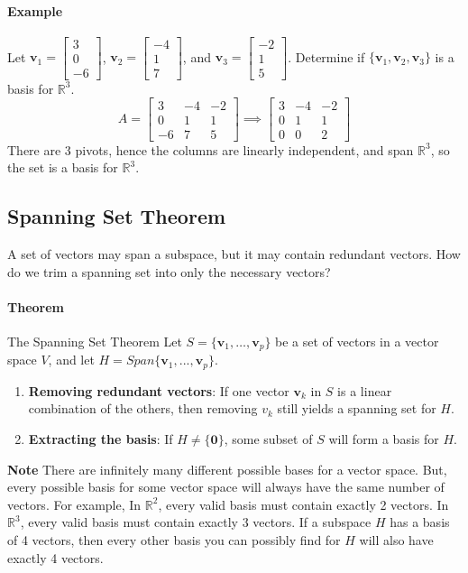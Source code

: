 \documentclass[../linear-algebra.tex]{subfiles}
\begin{document}
\paragraph{Example} Let $\mathbf{v}_{1}=\left[\begin{matrix}3\\ 0\\ -6\end{matrix}\right]$, $\mathbf{v}_{2}=\left[\begin{matrix}-4\\ 1\\ 7\end{matrix}\right]$, and $\mathbf{v}_{3}=\left[\begin{matrix}-2\\ 1\\ 5\end{matrix}\right]$. Determine if $\{\mathbf{v}_{1},\mathbf{v}_{2},\mathbf{v}_{3}\}$ is a basis for $\mathbb{R}^{3}$. 
\[A = \begin{bmatrix} 3 & -4 & -2 \\ 0 & 1 & 1 \\ -6 & 7 & 5 \end{bmatrix} \implies \begin{bmatrix} 3 & -4 & -2 \\ 0 & 1 & 1 \\ 0 & 0 & 2 \end{bmatrix}\]
There are 3 pivots, hence the columns are linearly independent, and span $\mathbb{R}^3$, so the set is a basis for $\mathbb{R}^3$.

\subsection{Spanning Set Theorem}
A set of vectors may span a subspace, but it may contain redundant vectors. How do we trim a spanning set into only the necessary vectors?
\paragraph{Theorem} The Spanning Set Theorem
Let $S=\{\mathbf{v}_{1},\ldots,\mathbf{v}_{p}\}$ be a set of vectors in a vector space $V$, and let $H=Span\{\mathbf{v}_{1},...,\mathbf{v}_{p}\}$.
\begin{enumerate}
    \item \textbf{Removing redundant vectors}: If one vector $\mathbf{v}_k$ in $S$ is a linear combination of the others, then removing $v_{k}$ still yields a spanning set for $H$.
    \item \textbf{Extracting the basis}: If $H\ne\{\mathbf{0}\}$, some subset of $S$ will form a basis for $H$.
\end{enumerate}
\textbf{Note} There are infinitely many different possible bases for a vector space. But, every possible basis for some vector space will always have the same number of vectors.
For example, In $\mathbb{R}^2$, every valid basis must contain exactly 2 vectors. In $\mathbb{R}^3$, every valid basis must contain exactly 3 vectors. If a subspace $H$ has a basis of 4 vectors, then every other basis you can possibly find for $H$ will also have exactly 4 vectors.
\end{document}

